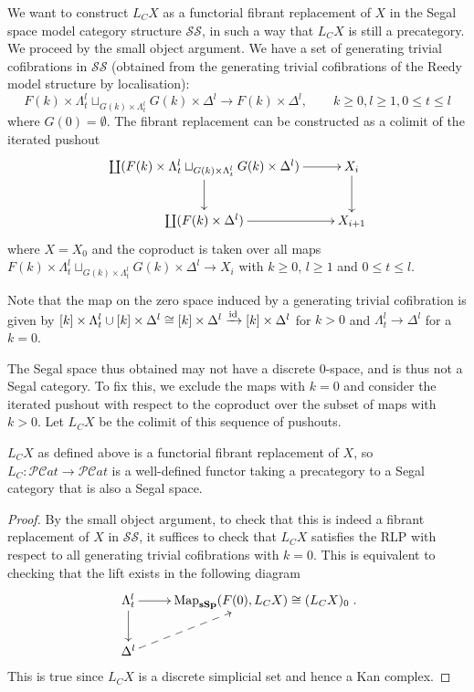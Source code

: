 \begin{refsection}
We want to construct $L_CX$ as a functorial fibrant replacement of $X$ in the Segal space model category structure $\mathcal{SS}$, in such a way that $L_CX$ is still a precategory. We proceed by the small object argument. We have a set of generating trivial cofibrations in $\mathcal{SS}$ (obtained from the generating trivial cofibrations of the Reedy model structure by localisation):
$$F(k)\times\Lambda^l_t\sqcup_{G(k)\times\Lambda^l_t}G(k)\times\Delta^l\to F(k)\times\Delta^l,\qquad k\ge0,l\ge1,0\le t\le l$$
where $G(0)=\emptyset$. The fibrant replacement can be constructed as a colimit of the iterated pushout
$$\xymatrix{\coprod(F(k)\times\Lambda^l_t\sqcup_{G(k)\times\Lambda^l_t}G(k)\times\Delta^l)\ar[r]\ar[d]&X_i\ar[d]\\
\coprod(F(k)\times\Delta^l)\ar[r]&X_{i+1}}$$
where $X=X_0$ and the coproduct is taken over all maps $F(k)\times\Lambda^l_t\sqcup_{G(k)\times\Lambda^l_t}G(k)\times\Delta^l\to X_i$ with $k\ge 0$, $l\ge 1$ and $0\le t\le l$.

Note that the map on the zero space induced by a generating trivial cofibration is given by $[k]\times\Lambda^l_t\cup[k]\times\Delta^l\cong [k]\times\Delta^l\xrightarrow{\mathrm{id}}[k]\times\Delta^l$ for $k> 0$ and $\Lambda^l_t\to\Delta^l$ for a $k=0$.

The Segal space thus obtained may not have a discrete 0-space, and is thus not a Segal category. To fix this, we exclude the maps with $k=0$ and consider the iterated pushout with respect to the coproduct over the subset of maps with $k>0$. Let $L_CX$ be the colimit of this sequence of pushouts.

\begin{prop}
$L_CX$ as defined above is a functorial fibrant replacement of $X$, so $L_C:\mathcal{PC}at\to\mathcal{PC}at$ is a well-defined functor taking a precategory to a Segal category that is also a Segal space.
\end{prop}

\begin{proof}
By the small object argument, to check that this is indeed a fibrant replacement of $X$ in $\mathcal{SS}$, it suffices to check that $L_CX$ satisfies the RLP with respect to all generating trivial cofibrations with $k=0$. This is equivalent to checking that the lift exists in the following diagram
$$\xymatrix{\Lambda^l_t\ar[r]\ar[d]&\Map_{\ssp}(F(0),L_CX)\cong (L_CX)_0\\\Delta^l\ar@{-->}[ur]}.$$
This is true since $L_CX$ is a discrete simplicial set and hence a Kan complex.
\end{proof}


\end{refsection}
